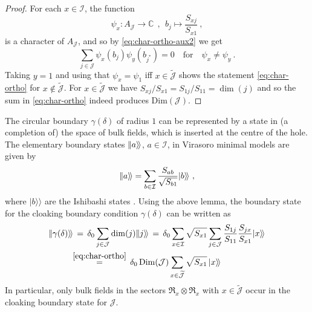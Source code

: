 \documentclass[11pt,a4paper]{article}
\numberwithin{equation}{section}
\def\ket#1{|{#1}\rangle}
\newcommand{\bndstate}[1]{|\hspace{-1pt}\ket{#1}\!\rangle}
\begin{document}
\begin{proof}
For each $x \in \mathcal{I}$, the function
\begin{equation}
    \psi_x : A_{\mathcal{J}} \to \mathbb{C}
    ~~,~~
    b_j \mapsto \frac{S_{xj}}{S_{x1}} \ ,
\end{equation}
is a character of $A_{\mathcal{J}}$, and so by \eqref{eq:char-ortho-aux2} we get
\begin{equation}
    \sum_{j \in \mathcal{J}} \psi_x(b_j) \psi_y(b_{j^*}) 
    = 0
    \quad \text{for} \quad \psi_x \neq \psi_y \ .
\end{equation}
Taking $y=1$ and using that $\psi_x = \psi_1$ iff $x \in \widetilde{\mathcal{J}}$ shows the statement \eqref{eq:char-ortho} for $x \notin \widetilde{\mathcal{J}}$. For $x \in \widetilde{\mathcal{J}}$ we have $S_{xj}/S_{x1} = S_{1j}/S_{11} = \dim(j)$ and so the sum in \eqref{eq:char-ortho} indeed produces $\mathrm{Dim}(\mathcal{J})$.
\end{proof}


\smallskip

The circular boundary $\gamma(\delta)$ of radius $1$ can be represented by a state in (a completion of) the space of bulk fields, which is inserted at the centre of the hole. 
The elementary boundary states $\bndstate{a}$, $a\in \mathcal{I}$, in Virasoro minimal models are given by
%
\begin{equation}
    \bndstate{a} = \sum_{b\in\mathcal{I}} \frac{S_{ab}}{\sqrt{S_{b1}}} \ket{b}\!\rangle \ ,
\end{equation}
%
where $\ket{b}\!\rangle$ are the Ishibashi states \cite{Ishibashi:1988kg,Cardy:1989ir}.
Using the above lemma, the boundary state for the cloaking boundary condition $\gamma(\delta)$ can be written as 
\begin{align}\label{eq:cloaking-bnd-state-via-tildeJ}
    \bndstate{\gamma(\delta)} 
    &\,=\, 
    \delta_0
    \sum_{j\in\mathcal{J}}\dim(j) \bndstate{j} 
    \,=\, 
\delta_0 \sum_{x \in\mathcal{I}} \sqrt{S_{x1}} \sum_{j \in\mathcal{J}} 
    \frac{S_{1j}}{S_{11}} \frac{S_{jx}}{S_{x1}} \ket{x}\!\rangle
    \nonumber \\
&\!\!\overset{\eqref{eq:char-ortho}}=\,
\delta_0 \, \mathrm{Dim}(\mathcal{J}) \sum_{x \in\widetilde{\mathcal{J}}} \sqrt{S_{x1}}  \,
\ket{x}\!\rangle
\end{align}
%
In particular, only bulk fields in the sectors $\mathfrak{R}_x \otimes \mathfrak{R}_x$ with $x \in \widetilde{\mathcal{J}}$ occur in the cloaking boundary state for $\mathcal{J}$.
\end{document}
